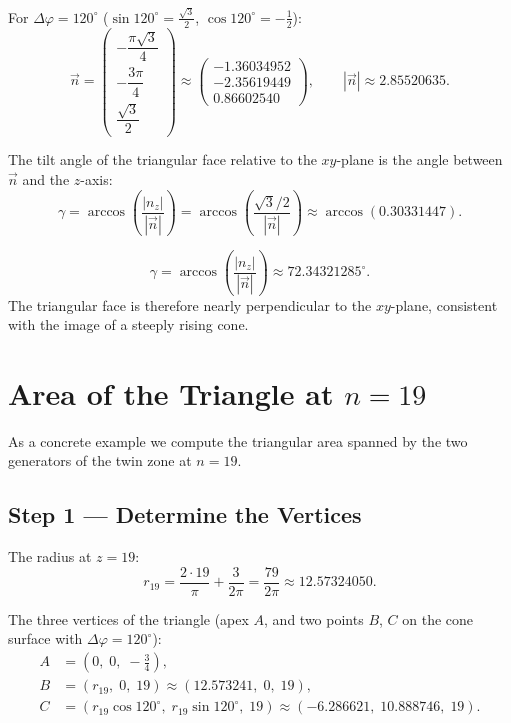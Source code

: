 For $\Delta\varphi = 120^\circ$ ($\sin 120^\circ = \tfrac{\sqrt{3}}{2}$,
$\cos 120^\circ = -\tfrac{1}{2}$):
\[
  \vec{n}
  = \begin{pmatrix}
      -\dfrac{\pi\sqrt{3}}{4}\\[6pt]
      -\dfrac{3\pi}{4}\\[6pt]
      \dfrac{\sqrt{3}}{2}
    \end{pmatrix}
  \approx
  \begin{pmatrix}-1.36034952\\-2.35619449\\0.86602540\end{pmatrix},
  \qquad
  |\vec{n}| \approx 2.85520635.
\]

The tilt angle of the triangular face relative to the $xy$-plane is the angle
between $\vec{n}$ and the $z$-axis:
\[
  \gamma
  = \arccos\!\left(\frac{|n_z|}{|\vec{n}|}\right)
  = \arccos\!\left(\frac{\sqrt{3}/2}{|\vec{n}|}\right)
  \approx \arccos(0.30331447).
\]

\begin{satz}
\begin{equation}
  \gamma = \arccos\!\left(\frac{|{n}_z|}{|\vec{n}|}\right)
  \approx 72.34321285^\circ.
\end{equation}
The triangular face is therefore nearly perpendicular to the $xy$-plane,
consistent with the image of a steeply rising cone.
\end{satz}

\section{Area of the Triangle at \texorpdfstring{$n = 19$}{n=19}}

As a concrete example we compute the triangular area spanned by the
two generators of the twin zone at $n = 19$.

\subsection*{Step 1 --- Determine the Vertices}

The radius at $z = 19$:
\[
  r_{19}
  = \frac{2\cdot 19}{\pi} + \frac{3}{2\pi}
  = \frac{79}{2\pi}
  \approx 12.57324050.
\]

The three vertices of the triangle (apex $A$, and two points $B$, $C$
on the cone surface with $\Delta\varphi = 120^\circ$):
\begin{align*}
  A &= \left(0,\; 0,\; -\tfrac{3}{4}\right), \\
  B &= \left(r_{19},\; 0,\; 19\right)
     \approx (12.573241,\; 0,\; 19), \\
  C &= \left(r_{19}\cos 120^\circ,\; r_{19}\sin 120^\circ,\; 19\right)
     \approx (-6.286621,\; 10.888746,\; 19).
\end{align*}

